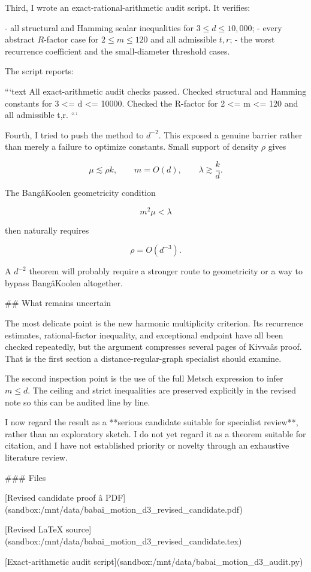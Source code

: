Third, I wrote an exact-rational-arithmetic audit script. It verifies:

- all structural and Hamming scalar inequalities for \(3\le d\le10{,}000\);
- every abstract \(R\)-factor case for \(2\le m\le120\) and all admissible \(t,r\);
- the worst recurrence coefficient and the small-diameter threshold cases.

The script reports:

```text
All exact-arithmetic audit checks passed.
Checked structural and Hamming constants for 3 <= d <= 10000.
Checked the R-factor for 2 <= m <= 120 and all admissible t,r.
```

Fourth, I tried to push the method to \(d^{-2}\). This exposed a genuine barrier rather than merely a failure to optimize constants. Small support of density \(\rho\) gives

\[
\mu\lesssim \rho k,
\qquad
m=O(d),
\qquad
\lambda\gtrsim\frac{k}{d}.
\]

The BangâKoolen geometricity condition

\[
m^2\mu<\lambda
\]

then naturally requires

\[
\rho=O(d^{-3}).
\]

A \(d^{-2}\) theorem will probably require a stronger route to geometricity or a way to bypass BangâKoolen altogether.

## What remains uncertain

The most delicate point is the new harmonic multiplicity criterion. Its recurrence estimates, rational-factor inequality, and exceptional endpoint have all been checked repeatedly, but the argument compresses several pages of Kivvaâs proof. That is the first section a distance-regular-graph specialist should examine.

The second inspection point is the use of the full Metsch expression to infer \(m\le d\). The ceiling and strict inequalities are preserved explicitly in the revised note so this can be audited line by line.

I now regard the result as a **serious candidate suitable for specialist review**, rather than an exploratory sketch. I do not yet regard it as a theorem suitable for citation, and I have not established priority or novelty through an exhaustive literature review.

### Files

[Revised candidate proof â PDF](sandbox:/mnt/data/babai_motion_d3_revised_candidate.pdf)

[Revised LaTeX source](sandbox:/mnt/data/babai_motion_d3_revised_candidate.tex)

[Exact-arithmetic audit script](sandbox:/mnt/data/babai_motion_d3_audit.py)